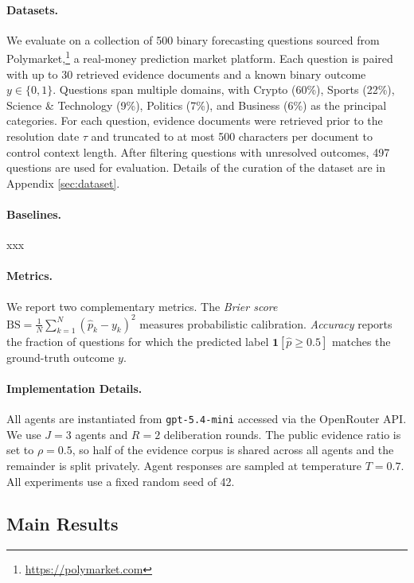 \documentclass[11pt]{article}
\theoremstyle{definition}          %
\begin{document}
\paragraph{Datasets.}
We evaluate on a collection of 500 binary forecasting questions sourced from Polymarket,\footnote{\url{https://polymarket.com}} a real-money prediction market platform.
Each question is paired with up to 30 retrieved evidence documents and a known binary outcome $y \in \{0,1\}$.
Questions span multiple domains, with Crypto (60\%), Sports (22\%), Science \& Technology (9\%), Politics (7\%), and Business (6\%) as the principal categories.
For each question, evidence documents were retrieved prior to the resolution date $\tau$ and truncated to at most 500 characters per document to control context length.
After filtering questions with unresolved outcomes, 497 questions are used for evaluation.
Details of the curation of the dataset are in Appendix \ref{sec:dataset}.

\paragraph{Baselines.}
xxx

\paragraph{Metrics.}
We report two complementary metrics.
The \emph{Brier score} $\mathrm{BS} = \frac{1}{N}\sum_{k=1}^{N}(\hat{p}_k - y_k)^2$ measures probabilistic calibration.
\emph{Accuracy} reports the fraction of questions for which the predicted label $\mathbf{1}[\hat{p} \geq 0.5]$ matches the ground-truth outcome $y$.

\paragraph{Implementation Details.}
All agents are instantiated from \texttt{gpt-5.4-mini} accessed via the OpenRouter API.
We use $J = 3$ agents and $R = 2$ deliberation rounds.
The public evidence ratio is set to $\rho = 0.5$, so half of the evidence corpus is shared across all agents and the remainder is split privately.
Agent responses are sampled at temperature $T = 0.7$.
All experiments use a fixed random seed of 42.

\subsection{Main Results}
\end{document}
